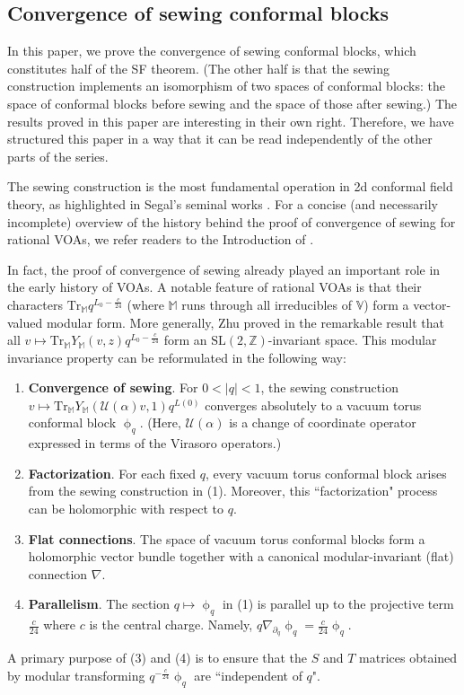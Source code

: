 \documentclass[11pt,b5paper,notitlepage]{article}
\theoremstyle{definition}
\theoremstyle{plain}
\newcommand{\mc}{\mathcal}
\newcommand{\Tr}{\mathrm{Tr}}
\newcommand{\Vbb}{\mathbb V}
\newcommand{\Mbb}{\mathbb M}
\newcommand{\Zbb}{\mathbb Z}
\newcommand{\<}{\left\langle}
\renewcommand{\>}{\right\rangle}
\numberwithin{equation}{section}
\begin{document}
\subsection{Convergence of sewing conformal blocks}\label{lbb62}





In this paper, we prove the convergence of sewing conformal blocks, which constitutes half of the SF theorem. (The other half is that the sewing construction implements an isomorphism of two spaces of conformal blocks: the space of conformal blocks before sewing and the space of those after sewing.) The results proved in this paper are interesting in their own right. Therefore, we have structured this paper in a way that it can be read independently of the other parts of the series.


The sewing construction is the most fundamental operation in 2d conformal field theory, as highlighted in Segal's seminal works \cite{Segal-CFT1,Segal-CFT2}. For a concise (and necessarily incomplete) overview of the history behind the proof of convergence of sewing for rational VOAs, we refer readers to the Introduction of \cite{Gui-sewingconvergence}.



In fact, the proof of convergence of sewing already played an important role in the early history of VOAs. A notable feature of rational VOAs is that their characters $\Tr_\Mbb q^{L_0-\frac c{24}}$ (where $\Mbb$ runs through all irreducibles of $\Vbb$) form a vector-valued modular form. More generally, Zhu proved in \cite{Zhu-modular-invariance} the remarkable result that all $v\mapsto \Tr_\Mbb Y_\Mbb(v,z)q^{L_0-\frac c{24}}$ form an $\mathrm{SL}(2,\Zbb)$-invariant space. This modular invariance property can be reformulated in the following way:

\begin{enumerate}[label=(\arabic*)]
\item \textbf{Convergence of sewing}. For $0<|q|<1$, the sewing construction $v\mapsto \Tr_\Mbb Y_\Mbb(\mc U(\alpha)v,1)q^{L(0)}$ converges absolutely to a vacuum torus conformal block $\upphi_q$. (Here, $\mc U(\alpha)$ is a change of coordinate operator expressed in terms of the Virasoro operators.)
\item \textbf{Factorization}. For each fixed $q$, every vacuum torus conformal block arises from the sewing construction in (1). Moreover, this ``factorization" process can be holomorphic with respect to $q$.
\item \textbf{Flat connections}. The space of vacuum torus conformal blocks form a holomorphic vector bundle together with a canonical modular-invariant (flat) connection $\nabla$. 
\item \textbf{Parallelism}. The section $q\mapsto \upphi_q$ in (1) is parallel up to the projective term $\frac c{24}$ where $c$ is the central charge. Namely, $q\nabla_{\partial_q}\upphi_q=\frac c{24}\upphi_q$.
\end{enumerate}
A primary purpose of (3) and (4) is to ensure that the $S$ and $T$ matrices obtained by modular transforming $q^{-\frac c{24}}\upphi_q$ are ``independent of $q$".
\end{document}
